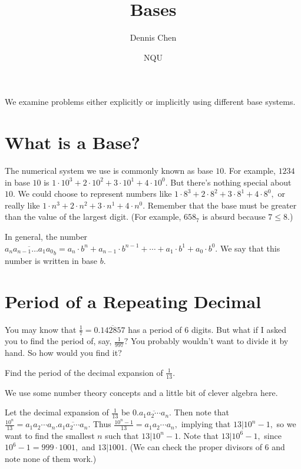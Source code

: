 \documentclass[mast]{lucky}
\title{Bases}
\author{Dennis Chen}
\date{NQU}
\begin{document}
\maketitle

We examine problems either explicitly or implicitly using different base systems.

\section{What is a Base?}
The numerical system we use is commonly known as base $10.$ For example, $1234$ in base $10$ is $1\cdot 10^3+2\cdot 10^2+3\cdot 10^1+4\cdot 10^0.$ But there's nothing special about $10.$ We could choose to represent numbers like $1\cdot 8^3+2\cdot 8^2+3\cdot 8^1+4\cdot 8^0,$ or really like $1\cdot n^3+2\cdot n^2+3\cdot n^1+4\cdot n^0.$ Remember that the base must be greater than the value of the largest digit. (For example, $658_7$ is absurd because $7\leq 8.$)

\begin{defi}[Base $b$]
In general, the number $\overline{a_na_{n-1}\ldots a_{1}a_{0}}_b=a_n\cdot b^n+a_{n-1}\cdot b^{n-1}+\cdots+a_1\cdot b^1+a_0\cdot b^0.$ We say that this number is written in base $b.$
\end{defi}

\section{Period of a Repeating Decimal}
You may know that $\frac{1}{7}=0.\overline{142857}$ has a period of $6$ digits. But what if I asked you to find the period of, say, $\frac{1}{997}?$ You probably wouldn't want to divide it by hand. So how would you find it?

\begin{exam}
Find the period of the decimal expansion of $\frac{1}{13}.$
\end{exam}

\begin{sol}
We use some number theory concepts and a little bit of clever algebra here.

Let the decimal expansion of $\frac{1}{13}$ be $0.\overline{a_1a_2\cdots a_n}.$ Then note that $\frac{10^n}{13}=a_1a_2\cdots a_n.\overline{a_1a_2\cdots a_n}.$ Thus $\frac{10^n-1}{13}=a_1a_2\cdots a_n,$ implying that $13|10^n-1,$ so we want to find the smallest $n$ such that $13|10^n-1.$ Note that $13|10^6-1,$ since $10^6-1=999\cdot 1001,$ and $13|1001.$ (We can check the proper divisors of $6$ and note none of them work.)
\end{sol}
\end{document}

